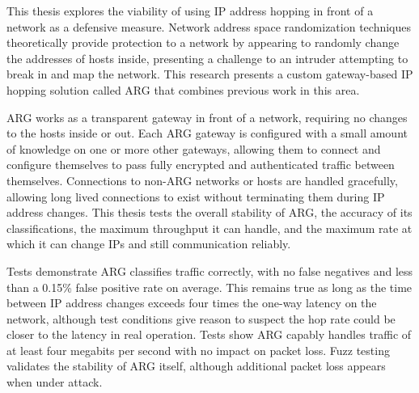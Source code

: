 \par This thesis explores the viability of using \ac{IP} address hopping in front of a network as a defensive measure. Network address space randomization techniques theoretically provide protection to a network by appearing to randomly change the addresses of hosts inside, presenting a challenge to an intruder attempting to break in and map the network. This research presents a custom gateway-based \ac{IP} hopping solution called \ac{ARG} that combines previous work in this area.

\par \ac{ARG} works as a transparent gateway in front of a network, requiring no changes to the hosts inside or out. Each \ac{ARG} gateway is configured with a small amount of knowledge on one or more other gateways, allowing them to connect and configure themselves to pass fully encrypted and authenticated traffic between themselves. Connections to non-\ac{ARG} networks or hosts are handled gracefully, allowing long lived connections to exist without terminating them during \ac{IP} address changes. This thesis tests the overall stability of \ac{ARG}, the accuracy of its classifications, the maximum throughput it can handle, and the maximum rate at which it can change \acp{IP} and still communication reliably.

\par Tests demonstrate \ac{ARG} classifies traffic correctly, with no false negatives and less than a 0.15\% false positive rate on average. This remains true as long as the time between \ac{IP} address changes exceeds four times the one-way latency on the network, although test conditions give reason to suspect the hop rate could be closer to the latency in real operation. Tests show \ac{ARG} capably handles traffic of at least four megabits per second with no impact on packet loss. Fuzz testing validates the stability of \ac{ARG} itself, although additional packet loss appears when under attack.

\acresetall

